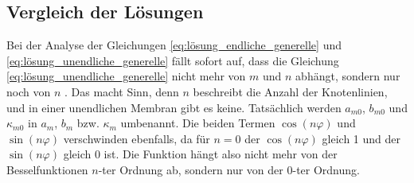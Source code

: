 \subsection{Vergleich der Lösungen
\label{kreismembran:vergleich}}
Bei der Analyse der Gleichungen \eqref{eq:lösung_endliche_generelle} und \eqref{eq:lösung_unendliche_generelle} fällt sofort auf, dass die Gleichung \eqref{eq:lösung_unendliche_generelle} nicht mehr von $m$ und $n$ abhängt, sondern nur noch von $n$ \cite{nishanth_p_vibrations_2018}. Das macht Sinn, denn $n$ beschreibt die Anzahl der Knotenlinien, und in einer unendlichen Membran gibt es keine. Tatsächlich werden $a_{m0}$, $b_{m0}$ und $\kappa_{m0}$ in $a_m$, $b_m$ bzw. $\kappa_m$ umbenannt. Die beiden Termen $\cos(n\varphi)$ und $\sin(n\varphi)$ verschwinden ebenfalls, da für $n=0$ der $\cos(n\varphi)$ gleich 1 und der $\sin(n \varphi)$ gleich 0 ist.
Die Funktion hängt also nicht mehr von der Besselfunktionen $n$-ter Ordnung ab, sondern nur von der $0$-ter Ordnung. 


